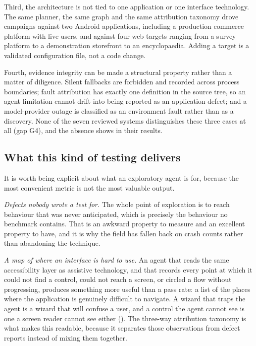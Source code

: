 Third, the architecture is not tied to one application or one interface
technology. The same planner, the same graph and the same attribution taxonomy
drove campaigns against two Android applications, including a production
commerce platform with live users, and against four web targets ranging from a
survey platform to a demonstration storefront to an encyclopaedia. Adding a
target is a validated configuration file, not a code change.

Fourth, evidence integrity can be made a structural property rather than a
matter of diligence. Silent fallbacks are forbidden and recorded across process
boundaries; fault attribution has exactly one definition in the source tree, so
an agent limitation cannot drift into being reported as an application defect;
and a model-provider outage is classified as an environment fault rather than as
a discovery. None of the seven reviewed systems distinguishes these three cases
at all (gap G4), and the absence shows in their results.

\subsection*{What this kind of testing delivers}

It is worth being explicit about what an exploratory agent is for, because the
most convenient metric is not the most valuable output.

\emph{Defects nobody wrote a test for.} The whole point of exploration is to
reach behaviour that was never anticipated, which is precisely the behaviour no
benchmark contains. That is an awkward property to measure and an excellent
property to have, and it is why the field has fallen back on crash counts rather
than abandoning the technique.

\emph{A map of where an interface is hard to use.} An agent that reads the same
accessibility layer as assistive technology, and that records every point at
which it could not find a control, could not reach a screen, or circled a flow
without progressing, produces something more useful than a pass rate: a list of
the places where the application is genuinely difficult to navigate. A wizard
that traps the agent is a wizard that will confuse a user, and a control the
agent cannot see is one a screen reader cannot see either
(). The three-way attribution taxonomy is what makes this
readable, because it separates those observations from defect reports instead of
mixing them together.

